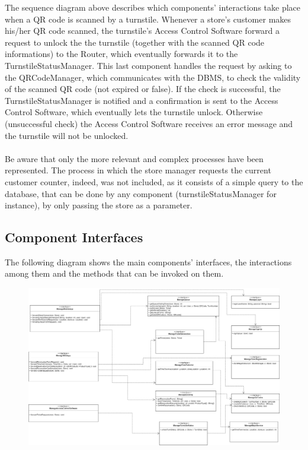 \documentclass{article}
\begin{document}
\noindent The sequence diagram above describes which components’ interactions take place when a QR code is scanned by a turnstile. Whenever a store’s customer makes his/her QR code scanned, the turnstile’s Access Control Software forward a request to unlock the the turnstile (together with the scanned QR code informations) to the Router, which eventually forwards it to the TurnstileStatusManager. This last component handles the request by asking to the QRCodeManager, which communicates with the DBMS, to check the validity of the scanned QR code (not expired or false). If the check is successful, the TurnstileStatusManager is notified and a confirmation is sent to the Access Control Software, which eventually lets the turnstile unlock. Otherwise (unsuccessful check) the Access Control Software receives an error message and the turnstile will not be unlocked.\\
\smallskip\\
Be aware that only the more relevant and complex processes have been represented.  The process in which the store manager requests the current customer counter, indeed, was not included, as it consists of a simple query to the database, that can be done by any component (turnstileStatusManager for instance), by only passing the store as a parameter.

\subsection{Component Interfaces}
The following diagram shows the main components' interfaces, the interactions among them and the methods that can be invoked on them.
\begin{figure}[H]
  \includegraphics[width=\linewidth]{interfacesDiagram.png}
  
\end{figure}
\end{document}
